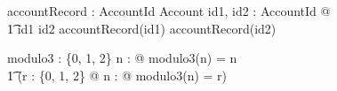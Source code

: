 \documentclass[a4paper,10pt,fleqn]{article}
\begin{document}
\begin{zed}
\end{zed}

\begin{axdef}
accountRecord : AccountId \inj Account
\where
\forall id1, id2 : AccountId @ \\
\t1 id1 \neq id2 \implies accountRecord(id1) \neq accountRecord(id2)
\end{axdef}

\begin{axdef}
modulo3 : \nat \surj \{0, 1, 2\}
\where
\forall n : \nat @ modulo3(n) = n  \land \\
\t1 (\forall r : \{0, 1, 2\} @ \exists n : \nat @ modulo3(n) = r)
\end{axdef}
\end{document}
